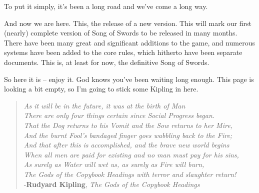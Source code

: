 \documentclass[oneside,11pt,english]{book}
\begin{document}
To put it simply, it’s been a long road and we’ve come a long way.


\noindent And now we are here. This, the release of a new version. This will mark our first (nearly) complete 
version of Song of Swords to be released in many months. There have been many great and significant 
additions to the game, and numerous systems have been added to the core rules, which hitherto have been 
separate documents. This is, at least for now, the definitive Song of Swords. 


So here it is -- enjoy it. God knows you’ve been waiting long enough. This page is looking a bit empty, so 
I’m going to stick some Kipling in here. 
\vspace{0.8 cm}
 {\large 
\begin{verse}
\emph{As it will be in the future, it was at the birth of Man\\
There are only four things certain since Social Progress began. \\
That the Dog returns to his Vomit and the Sow returns to her Mire,\\
And the burnt Fool's bandaged finger goes wabbling back to the Fire; \\}
\vspace{0.4 cm}
\emph{And that after this is accomplished, and the brave new world begins \\ 
When all men are paid for existing and no man must pay for his sins, \\
As surely as Water will wet us, as surely as Fire will burn, \\ 
The Gods of the Copybook Headings with terror and slaughter return! \\}
\vspace{0.3 cm}
\hfill-\textbf{Rudyard Kipling}, \textit{The Gods of the Copybook Headings} 
\end{verse}}
	\newpage
\end{document}

